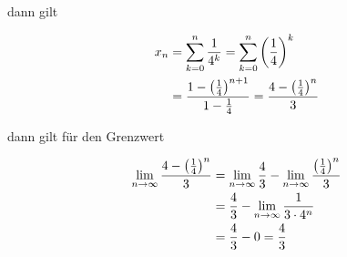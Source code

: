 \documentclass[a4paper, 11pt]{article}
\begin{document}
dann gilt

\begin{align*}
    x_n &= \sum_{k = 0}^{n} \frac{1}{4^k}
    = \sum_{k = 0}^{n} \left(\frac{1}{4}\right)^k \\
    &= \frac{1 - \left(\frac{1}{4}\right)^{n+1}}{1 - \frac{1}{4}}
    = \frac{4 - \left(\frac{1}{4}\right)^n}{3}
\end{align*}

dann gilt für den Grenzwert

\begin{align*}
    \lim_{n \rightarrow \infty} \frac{4 - \left(\frac{1}{4}\right)^n}{3} &=
        \lim_{n \rightarrow \infty} \frac{4}{3} -
        \lim_{n \rightarrow \infty} \frac{\left(\frac{1}{4}\right)^n}{3} \\
    &= \frac{4}{3} - \lim_{n \rightarrow \infty} \frac{1}{3 \cdot 4^n} \\
    &= \frac{4}{3} - 0 = \frac{4}{3}
\end{align*}
\end{document}
